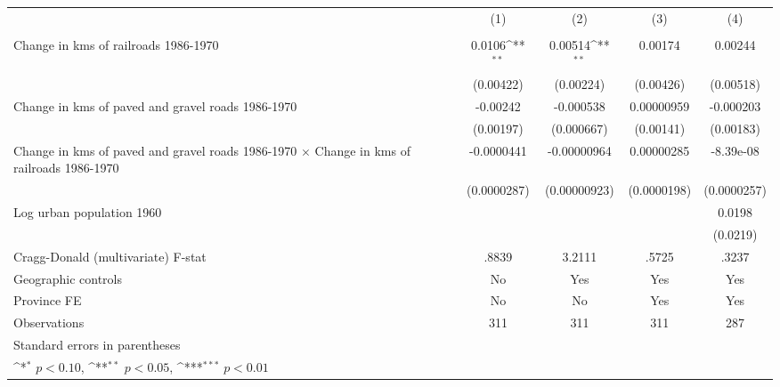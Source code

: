 {
\def\sym#1{\ifmmode^{#1}\else\(^{#1}\)\fi}
\begin{tabular}{l*{4}{c}}
\hline\hline
                &\multicolumn{1}{c}{(1)}&\multicolumn{1}{c}{(2)}&\multicolumn{1}{c}{(3)}&\multicolumn{1}{c}{(4)}\\
                &\multicolumn{1}{c}{}&\multicolumn{1}{c}{}&\multicolumn{1}{c}{}&\multicolumn{1}{c}{}\\
\hline
Change in kms of railroads 1986-1970&   0.0106\sym{**} &  0.00514\sym{**} &  0.00174         &  0.00244         \\
                &(0.00422)         &(0.00224)         &(0.00426)         &(0.00518)         \\
[1em]
Change in kms of paved and gravel roads 1986-1970& -0.00242         &-0.000538         &0.00000959         &-0.000203         \\
                &(0.00197)         &(0.000667)         &(0.00141)         &(0.00183)         \\
[1em]
Change in kms of paved and gravel roads 1986-1970 $\times$ Change in kms of railroads 1986-1970&-0.0000441         &-0.00000964         &0.00000285         &-8.39e-08         \\
                &(0.0000287)         &(0.00000923)         &(0.0000198)         &(0.0000257)         \\
[1em]
Log urban population 1960&                  &                  &                  &   0.0198         \\
                &                  &                  &                  & (0.0219)         \\
\hline
Cragg-Donald (multivariate) F-stat&    .8839         &   3.2111         &    .5725         &    .3237         \\
Geographic controls&       No         &      Yes         &      Yes         &      Yes         \\
Province FE     &       No         &       No         &      Yes         &      Yes         \\
Observations    &      311         &      311         &      311         &      287         \\
\hline\hline
\multicolumn{5}{l}{\footnotesize Standard errors in parentheses}\\
\multicolumn{5}{l}{\footnotesize \sym{*} \(p<0.10\), \sym{**} \(p<0.05\), \sym{***} \(p<0.01\)}\\
\end{tabular}
}

